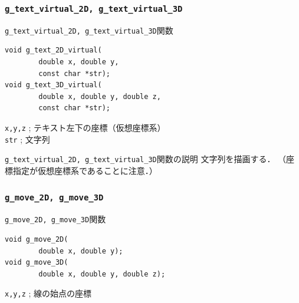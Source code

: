 \documentclass[platex,a4paper,12pt]{jsarticle}%
\begin{document}
\subsubsection{\texttt{g\_text\_virtual\_2D, g\_text\_virtual\_3D}}

\begin{itembox}[l]{\texttt{g\_text\_virtual\_2D, g\_text\_virtual\_3D}関数}
\begin{verbatim}
void g_text_2D_virtual(
        double x, double y,
        const char *str);
void g_text_3D_virtual(
        double x, double y, double z,
        const char *str);      
\end{verbatim}
\verb|x,y,z| ; テキスト左下の座標（仮想座標系）\\
\verb|str| ; 文字列
\end{itembox}

\begin{itembox}[l]{\texttt{g\_text\_virtual\_2D, g\_text\_virtual\_3D}関数の説明}
文字列を描画する．
（座標指定が仮想座標系であることに注意．）
\end{itembox}

\begin{figure}[htb]
\end{figure}




\clearpage
\subsubsection{\texttt{g\_move\_2D, g\_move\_3D}}

\begin{itembox}[l]{\texttt{g\_move\_2D, g\_move\_3D}関数}
\begin{verbatim}
void g_move_2D(
        double x, double y);
void g_move_3D(
        double x, double y, double z);     
\end{verbatim}
\verb|x,y,z| ; 線の始点の座標\\
\end{itembox}
\end{document}
